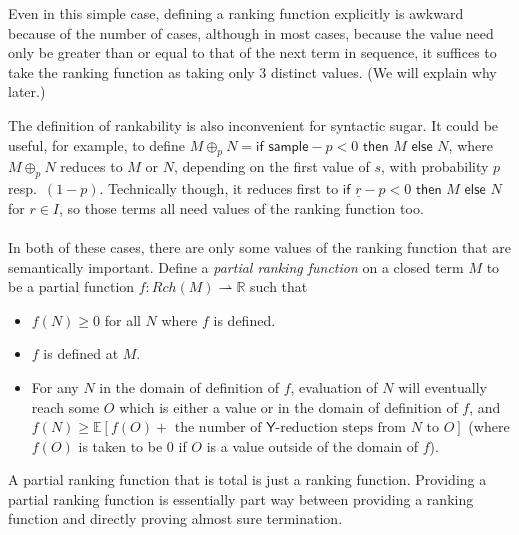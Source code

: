 \documentclass{article}
\newcommand{\tY}{\textsf{Y}}
\newcommand{\tif}[3]{\textsf{if }#1\textsf{ then }#2\textsf{ else }#3}
\newcommand{\tsample}{\textsf{sample}}
\theoremstyle{definition}
\theoremstyle{lemma}
\theoremstyle{remark}
\begin{document}
Even in this simple case, defining a ranking function explicitly is awkward because of the number of cases, although in most cases, because the value need only be greater than or equal to that of the next term in sequence, it suffices to take the ranking function as taking only 3 distinct values.
(We will explain why later.)

The definition of rankability is also inconvenient for syntactic sugar. It could be useful, for example, to define $M \oplus_p N = \tif{\tsample - p < 0} M N$, where $M \oplus_p N$ reduces to $M$ or $N$, depending on the first value of $s$, with probability $p$ resp.~$(1-p)$. Technically though, it reduces first to $\tif{\underline r - p < 0} M N$ for $r \in I$, so those terms all need values of the ranking function too.

\paragraph{}
In both of these cases, there are only some values of the ranking function that are semantically important. Define a \emph{partial ranking function} on a closed term $M$ to be a partial function $f : Rch(M) \rightharpoonup \mathbb R$ such that
\begin{itemize}
    \item $f(N) \geq 0$ for all $N$ where $f$ is defined.
    \item $f$ is defined at $M$.
    \item For any $N$ in the domain of definition of $f$, evaluation of $N$ will eventually  reach some $O$ which is either a value or in the domain of definition of $f$, and $f(N) \geq \mathbb E[f(O) + \text{ the number of $\tY$-reduction steps from $N$ to $O$}]$ (where $f(O)$ is taken to be 0 if $O$ is a value outside of the domain of $f$).
\end{itemize}
A partial ranking function that is total is just a ranking function. Providing a partial ranking function is essentially part way between providing a ranking function and directly proving almost sure termination.
\end{document}
